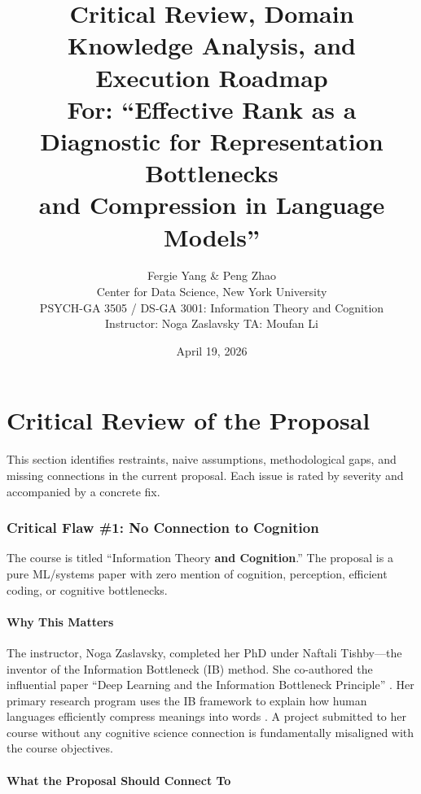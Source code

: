 \documentclass[11pt,a4paper]{article}
\title{\textbf{Critical Review, Domain Knowledge Analysis, and Execution Roadmap} \\[6pt]
\large For: ``Effective Rank as a Diagnostic for Representation Bottlenecks \\
and Compression in Language Models''}
\author{Fergie Yang \quad \& \quad Peng Zhao \\
\small Center for Data Science, New York University \\
\small PSYCH-GA 3505 / DS-GA 3001: Information Theory and Cognition \\
\small Instructor: Noga Zaslavsky \quad TA: Moufan Li}
\date{April 19, 2026}
\begin{document}
\maketitle
\tableofcontents
\newpage

\part{Critical Review of the Proposal}

This section identifies restraints, naive assumptions, methodological gaps, and missing connections in the current proposal. Each issue is rated by severity and accompanied by a concrete fix.

\section{Critical Flaw \#1: No Connection to Cognition}

\begin{criticalbox}
The course is titled ``Information Theory \textbf{and Cognition}.'' The proposal is a pure ML/systems paper with zero mention of cognition, perception, efficient coding, or cognitive bottlenecks.
\end{criticalbox}

\subsection{Why This Matters}

The instructor, Noga Zaslavsky, completed her PhD under Naftali Tishby---the inventor of the Information Bottleneck (IB) method. She co-authored the influential paper ``Deep Learning and the Information Bottleneck Principle'' \cite{tishby2015deep}. Her primary research program uses the IB framework to explain how human languages efficiently compress meanings into words \cite{zaslavsky2018efficient}. A project submitted to her course without any cognitive science connection is fundamentally misaligned with the course objectives.

\subsection{What the Proposal Should Connect To}
\end{document}
